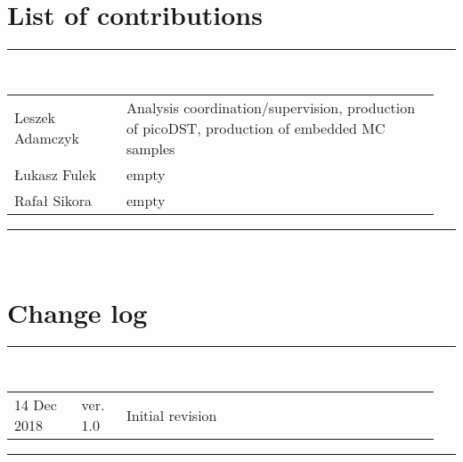 \section*{\LARGE List of contributions}%
%
   \rule{\textwidth}{1.5pt}\\[5pt]%
      \begin{tabular}{>{\raggedright}p{0.25\linewidth}p{0.7\linewidth}}
		Leszek Adamczyk & Analysis coordination/supervision, production of picoDST, production of embedded MC samples\\
		Łukasz Fulek & empty\\
        Rafał Sikora &  empty\\
      \end{tabular}\newline
   \rule{\textwidth}{1.5pt}\\[50pt]%
\section*{\LARGE Change log}%
%
  \rule{\textwidth}{1.5pt}\\[5pt]%
  \begin{tabular}{>{\raggedright}p{0.15\linewidth}p{0.1\linewidth}p{0.7\linewidth}}
  	14 Dec 2018 & ver. 1.0 & Initial revision
  \end{tabular}\newline%
 \rule{\textwidth}{1.5pt}